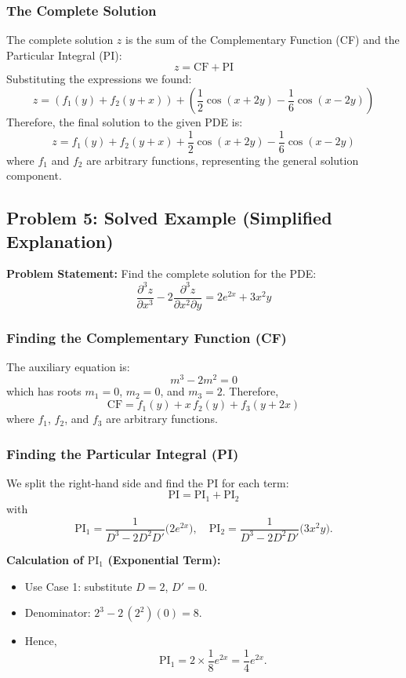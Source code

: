 \documentclass{article}
\theoremstyle{remark}
\begin{document}
	\subsubsection{The Complete Solution}
	The complete solution $z$ is the sum of the Complementary Function (CF) and the Particular Integral (PI):
	\[
	z = \text{CF} + \text{PI}
	\]
	Substituting the expressions we found:
	\[
	z = \left( f_1(y) + f_2(y+x) \right) + \left( \frac{1}{2}\cos(x+2y) - \frac{1}{6}\cos(x-2y) \right)
	\]
	Therefore, the final solution to the given PDE is:
	\[
	\boxed{z = f_1(y) + f_2(y+x) + \frac{1}{2}\cos(x+2y) - \frac{1}{6}\cos(x-2y)}
	\]
	where $f_1$ and $f_2$ are arbitrary functions, representing the general solution component.
	
	\subsection{Problem 5: Solved Example (Simplified Explanation)}
	\textbf{Problem Statement:} Find the complete solution for the PDE:
	\[
	\frac{\partial^3 z}{\partial x^3} - 2 \frac{\partial^3 z}{\partial x^2 \partial y} = 2e^{2x} + 3x^2y
	\]
	
	\subsubsection{Finding the Complementary Function (CF)}
	The auxiliary equation is:
	\[
	m^3 - 2m^2 = 0
	\]
	which has roots \(m_1=0\), \(m_2=0\), and \(m_3=2\). Therefore,
	\[
	\boxed{\text{CF} = f_1(y) + x\,f_2(y) + f_3(y+2x)}
	\]
	where \(f_1\), \(f_2\), and \(f_3\) are arbitrary functions.
	
	\subsubsection{Finding the Particular Integral (PI)}
	We split the right-hand side and find the PI for each term:
	\[
	\text{PI} = \text{PI}_1 + \text{PI}_2
	\]
	with
	\[
	\text{PI}_1 = \frac{1}{D^3 - 2D^2D'}\bigl(2e^{2x}\bigr),\quad
	\text{PI}_2 = \frac{1}{D^3 - 2D^2D'}\bigl(3x^2y\bigr).
	\]
	
	\textbf{Calculation of \(\text{PI}_1\) (Exponential Term):}
	\begin{itemize}
		\item Use Case 1: substitute \(D=2\), \(D'=0\).  
		\item Denominator: \(2^3 - 2\,(2^2)(0)=8\).  
		\item Hence,
		\[
		\text{PI}_1 = 2 \times \frac{1}{8}e^{2x} = \frac{1}{4}e^{2x}.
		\]
	\end{itemize}
	
\end{document}
